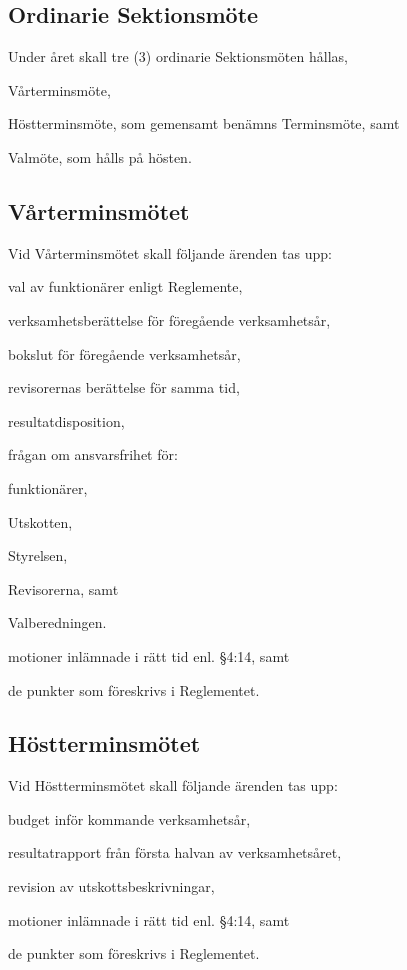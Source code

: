 \documentclass[10pt]{article}
\begin{document}
\subsection{Ordinarie Sektionsmöte}
Under året skall tre (3) ordinarie Sektionsmöten hållas,
\begin{alphlist}
\item 	Vårterminsmöte,
\item 	Höstterminsmöte, som gemensamt benämns Terminsmöte, samt
\item 	Valmöte, som hålls på hösten.
\end{alphlist}

\subsection{Vårterminsmötet}
Vid Vårterminsmötet skall följande ärenden tas upp:
\begin{alphlist}
\item 	val av funktionärer enligt Reglemente,
\item 	verksamhetsberättelse för föregående verksamhetsår,
\item 	bokslut för föregående verksamhetsår,
\item 	revisorernas berättelse för samma tid,
\item 	resultatdisposition,
\item 	frågan om ansvarsfrihet för:
    \begin{numplist}
        \item  	funktionärer,
        \item 	Utskotten,
        \item 	Styrelsen,
        \item 	Revisorerna, samt
        \item 	Valberedningen.
    \end{numplist}
\item 	motioner inlämnade i rätt tid enl. §4:14, samt
\item 	de punkter som föreskrivs i Reglementet.
\end{alphlist}

\subsection{Höstterminsmötet}
Vid Höstterminsmötet skall följande ärenden tas upp:
\begin{alphlist}
\item 	budget inför kommande verksamhetsår,
\item 	resultatrapport från första halvan av verksamhetsåret,
\item 	revision av utskottsbeskrivningar,
\item 	motioner inlämnade i rätt tid enl. §4:14, samt
\item 	de punkter som föreskrivs i Reglementet.
\end{alphlist}
\end{document}
